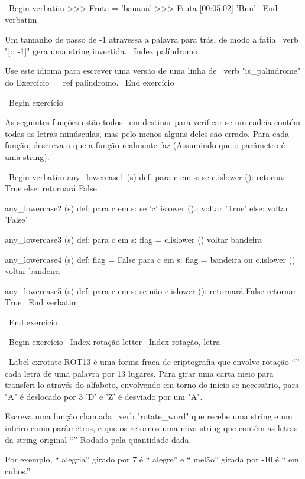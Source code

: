 \documentclass[10pt]{book}
\begin{document}
{{{{{{\ Begin {verbatim}
>>> Fruta = 'banana'
>>> Fruta [00:05:02]
'Bnn'
\ End {verbatim}

Um tamanho de passo de -1 atravessa a palavra para trás, de modo
a fatia \ verb "[:: -1]" gera uma string invertida.
\ Index {palíndromo}

Use este idioma para escrever uma versão de uma linha de \ verb "is_palindrome"
do Exercício ~ \ ref {} palíndromo.
\ End {} exercício


\ Begin {} exercício

As seguintes funções estão todos {\ em destinar} para verificar se um
cadeia contém todas as letras minúsculas, mas pelo menos alguns deles são
errado. Para cada função, descreva o que a função realmente faz
(Assumindo que o parâmetro é uma string).

\ Begin {verbatim}
any_lowercase1 (s) def:
    para c em s:
        se c.islower ():
            retornar True
        else:
            retornará False

any_lowercase2 (s) def:
    para c em s:
        se 'c' islower ().:
            voltar 'True'
        else:
            voltar 'False'

any_lowercase3 (s) def:
    para c em s:
        flag = c.islower ()
    voltar bandeira

any_lowercase4 (s) def:
    flag = False
    para c em s:
        flag = bandeira ou c.islower ()
    voltar bandeira

any_lowercase5 (s) def:
    para c em s:
        se não c.islower ():
            retornará False
    retornar True
\ End {verbatim}

\ End {} exercício


\ Begin {} exercício
\ Index {rotação letter}
\ Index {rotação, letra}

\ Label {} exrotate
ROT13 é uma forma fraca de criptografia que envolve rotação ``'' cada
letra de uma palavra por 13 lugares. Para girar uma carta meio
para transferi-lo através do alfabeto, envolvendo em torno do início se
necessário, para "A" é deslocado por 3 'D' e 'Z' é desviado por um "A".

Escreva uma função chamada \ verb "rotate_word"
que recebe uma string e um inteiro como parâmetros, e que os retornos
uma nova string que contém as letras da string original
``'' Rodado pela quantidade dada.  

Por exemplo, `` alegria'' girado por 7 é `` alegre'' e `` melão'' girada
por -10 é `` em cubos.''  


}}}}}}
\end{document}
